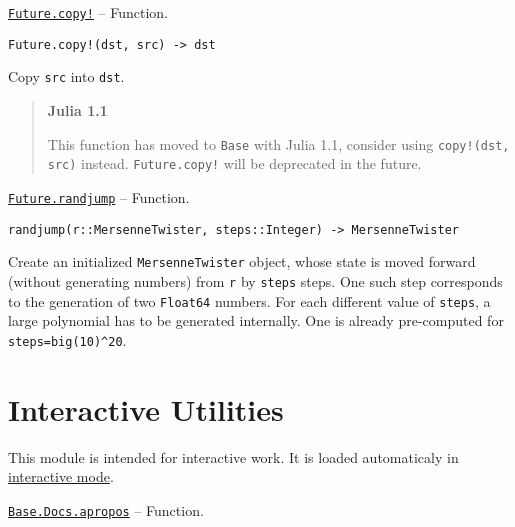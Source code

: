 \hypertarget{16402194721737034995}{}
\hyperlink{16402194721737034995}{\texttt{Future.copy!}}  -- {Function.}

\begin{adjustwidth}{2em}{0pt}


\begin{verbatim}
Future.copy!(dst, src) -> dst
\end{verbatim}

Copy \texttt{src} into \texttt{dst}.

\begin{quote}
\textbf{Julia 1.1}

This function has moved to \texttt{Base} with Julia 1.1, consider using \texttt{copy!(dst, src)} instead. \texttt{Future.copy!} will be deprecated in the future.

\end{quote}


\end{adjustwidth}
\hypertarget{16884066495147636882}{}
\hyperlink{16884066495147636882}{\texttt{Future.randjump}}  -- {Function.}

\begin{adjustwidth}{2em}{0pt}


\begin{verbatim}
randjump(r::MersenneTwister, steps::Integer) -> MersenneTwister
\end{verbatim}

Create an initialized \texttt{MersenneTwister} object, whose state is moved forward (without generating numbers) from \texttt{r} by \texttt{steps} steps. One such step corresponds to the generation of two \texttt{Float64} numbers. For each different value of \texttt{steps}, a large polynomial has to be generated internally. One is already pre-computed for \texttt{steps=big(10){\textasciicircum}20}.



\end{adjustwidth}

\hypertarget{11599433796564908990}{}


\chapter{Interactive Utilities}



This module is intended for interactive work. It is loaded automaticaly in \hyperlink{631314801744611}{interactive mode}.


\hypertarget{6069714544176255543}{}
\hyperlink{6069714544176255543}{\texttt{Base.Docs.apropos}}  -- {Function.}


